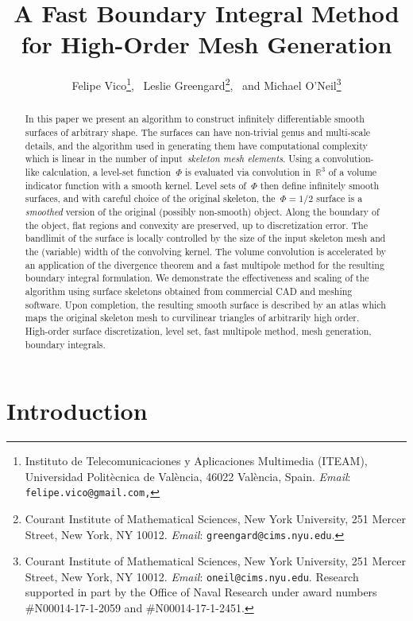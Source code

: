 \documentclass[11pt]{article}
\title{\bf{A Fast Boundary Integral Method
    for High-Order Mesh Generation}}
\author{Felipe Vico\thanks{Instituto de Telecomunicaciones y
    Aplicaciones Multimedia (ITEAM), 
    Universidad Polit\`ecnica
    de Val\`encia, 46022 Val\`encia, Spain.
    {\em Email}: \texttt{felipe.vico@gmail.com,}}, \,
Leslie Greengard\thanks{Courant Institute of Mathematical Sciences,
         New York University, 
         251 Mercer Street,
         New York, NY 10012.
{\em Email}: \texttt{greengard@cims.nyu.edu}. }, \, 
and Michael O'Neil\thanks{Courant Institute of Mathematical Sciences,
         New York University, 
         251 Mercer Street,
         New York, NY 10012.
{\em Email}: \texttt{oneil@cims.nyu.edu}. Research supported in part by
  the Office of Naval Research under award numbers
    \#N00014-17-1-2059 and \#N00014-17-1-2451.}}
\date{}
\numberwithin{equation}{section}
\newcommand\bbR{\mathbb R}
\begin{document}
\maketitle




\begin{abstract}
  In this paper we present an algorithm to construct infinitely
  differentiable smooth surfaces of arbitrary shape.  The surfaces can
  have non-trivial genus and multi-scale details, and the algorithm
  used in generating them have computational complexity which is
  linear in the number of input~\emph{skeleton mesh elements}.  Using
  a convolution-like calculation, a level-set function~$\Phi$ is
  evaluated via convolution in~$\bbR^3$ of a volume indicator function
  with a smooth kernel.  Level sets of~$\Phi$ then define infinitely
  smooth surfaces, and with careful choice of the original skeleton,
  the~$\Phi=1/2$ surface is a \emph{smoothed} version of the original
  (possibly non-smooth) object.  Along the boundary of the object,
  flat regions and convexity are preserved, up to discretization
  error.  The bandlimit of the surface is locally controlled by the
  size of the input skeleton mesh and the (variable) width of the
  convolving kernel.  The volume convolution is accelerated by an
  application of the divergence theorem and a fast multipole method
  for the resulting boundary integral formulation.  We demonstrate the
  effectiveness and scaling of the algorithm using surface skeletons
  obtained from commercial CAD and meshing software.  Upon completion,
  the resulting smooth surface is described by an atlas which maps the
  original skeleton mesh to curvilinear triangles of arbitrarily high
  order.\\

   High-order surface discretization, level set,
  fast multipole method, mesh generation, boundary integrals.

\end{abstract}




\section{Introduction}
\end{document}
